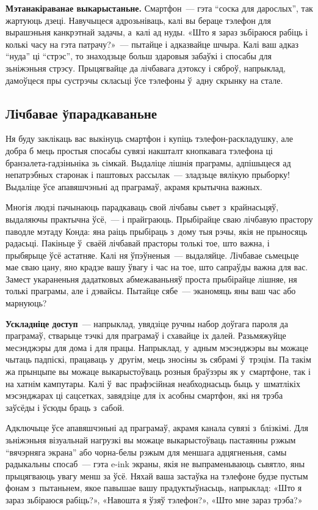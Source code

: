 \textbf{Мэтанакіраванае выкарыстаньне.} Смартфон~--- гэта ``соска для дарослых'', так жартуюць дзеці. Навучыцеся адрозьніваць, калі вы бераце тэлефон для вырашэньня канкрэтнай задачы, а~калі ад нуды. «Што я зараз зьбіраюся рабіць і колькі часу на гэта патрачу?»~--- пытайце і адказвайце шчыра. Калі ваш адказ ``нуда'' ці ``стрэс'', то знаходзьце больш здаровыя забаўкі і спосабы для зьніжэньня стрэсу. Прыцягвайце да лічбавага дэтоксу і сяброў, напрыклад, дамоўцеся пры сустрэчы скласьці ўсе тэлефоны ў~адну скрынку на стале.

\subsection*{Лічбавае ўпарадкаваньне}

Ня буду заклікаць вас выкінуць смартфон і купіць тэлефон-раскладушку, але добра б мець простыя спосабы сувязі накшталт кнопкавага тэлефона ці бранзалета-гадзіньніка зь сімкай. Выдаліце лішнія праграмы, адпішыцеся ад непатрэбных старонак і паштовых рассылак~--- зладзьце вялікую прыборку! Выдаліце ўсе апавяшчэньні ад праграмаў, акрамя крытычна важных.

Многія людзі пачынаюць парадкаваць свой лічбавы сьвет з~крайнасьцяў, выдаляючы практычна ўсё,~--- і прайграюць. Прыбірайце сваю лічбавую прастору паводле мэтаду Конда: яна раіць прыбіраць з~дому тыя рэчы, якія не прыносяць радасьці. Пакіньце ў~сваёй лічбавай прасторы толькі тое, што важна, і прыбярыце ўсё астатняе. Калі ня ўпэўненыя~--- выдаляйце. Лічбавае сьмецьце мае сваю цану, яно крадзе вашу ўвагу і час на тое, што сапраўды важна для вас. Замест укараненьня дадатковых абмежаваньняў проста прыбірайце лішняе, ня толькі праграмы, але і дэвайсы. Пытайце сябе~--- эканомяць яны ваш час або марнуюць?

\textbf{Ускладніце доступ}~--- напрыклад, увядзіце ручны набор доўгага пароля да праграмаў, стварыце тэчкі для праграмаў і схавайце іх далей. Разьмяжуйце месэнджэры для дома і для працы. Напрыклад, у~адным мэсэнджэры вы можаце чытаць падпіскі, працаваць у~другім, мець зносіны зь сябрамі ў~трэцім. Па такім жа прынцыпе вы можаце выкарыстоўваць розныя браўзэры як у~смартфоне, так і на хатнім кампутары. Калі ў~вас прафэсійная неабходнасьць быць у~шматлікіх мэсэнджарах ці сацсетках, завядзіце для іх асобны смартфон, які ня трэба заўсёды і ўсюды браць з~сабой.

Адключыце ўсе апавяшчэньні ад праграмаў, акрамя канала сувязі з~блізкімі. Для зьніжэньня візуальнай нагрузкі вы можаце выкарыстоўваць пастаянны рэжым ``вячэрняга экрана'' або чорна-белы рэжым для меншага адцягненьня, самы радыкальны спосаб~--- гэта e-ink экраны, якія не выпраменьваюць сьвятло, яны прыцягваюць увагу менш за ўсё. Няхай ваша застаўка на тэлефоне будзе пустым фонам з~пытаньнем, якое павышае вашу прадуктыўнасьць, напрыклад: «Што я зараз зьбіраюся рабіць?», «Навошта я ўзяў тэлефон?», «Што мне зараз трэба?»

